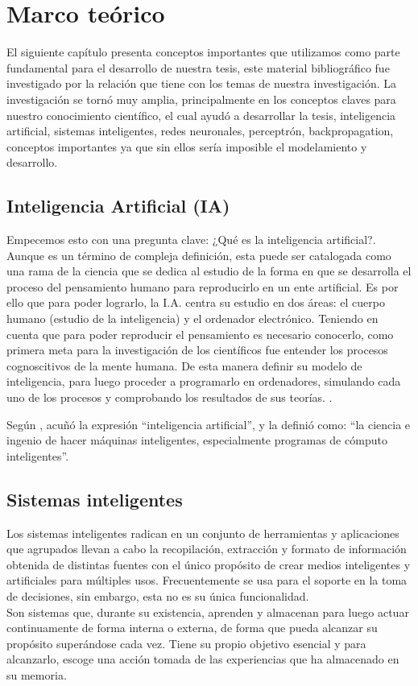 \section{Marco teórico}
El siguiente capítulo presenta conceptos importantes que utilizamos como parte fundamental para el desarrollo de nuestra tesis, este material bibliográfico fue investigado por la relación que tiene con los temas de nuestra investigación. La investigación se tornó muy amplia, principalmente en los conceptos claves para nuestro conocimiento científico, el cual ayudó a desarrollar la tesis, inteligencia artificial, sistemas inteligentes, redes neuronales, perceptrón, backpropagation, conceptos importantes ya que sin ellos sería imposible el modelamiento y desarrollo.

\subsection{Inteligencia Artificial (IA)}
Empecemos esto con una pregunta clave: ¿Qué es la inteligencia artificial?. Aunque es un término de compleja definición, esta puede ser catalogada como una rama de la ciencia que se dedica al estudio de la forma en que se desarrolla el proceso del pensamiento humano para reproducirlo en un ente artificial. Es por ello que para poder lograrlo, la I.A. centra su estudio en dos áreas: el cuerpo humano (estudio de la inteligencia) y el ordenador electrónico. Teniendo en cuenta que para poder reproducir el pensamiento es necesario conocerlo, como primera meta para la investigación de los científicos fue entender los procesos cognoscitivos de la mente humana. De esta manera definir su modelo de inteligencia, para luego proceder a programarlo en ordenadores, simulando cada uno de los procesos y comprobando los resultados de sus teorías. \citep{Belzebu2009}. 

Según \cite{mccarthy1989artificial}, acuñó la expresión ``inteligencia artificial'', y la definió como: ``la ciencia e ingenio de hacer máquinas inteligentes, especialmente programas de cómputo inteligentes''.

\subsection{Sistemas inteligentes}
Los sistemas inteligentes radican en un conjunto de herramientas y aplicaciones que agrupados llevan a cabo la recopilación, extracción y formato de información obtenida de distintas fuentes con el único propósito de crear medios inteligentes y artificiales para múltiples usos. Frecuentemente se usa para el soporte en la toma de decisiones, sin embargo, esta no es su única funcionalidad.\\
Son sistemas que, durante su existencia, aprenden y almacenan para luego actuar continuamente de forma interna o externa, de forma que pueda alcanzar su propósito superándose cada vez. Tiene su propio objetivo esencial y para alcanzarlo, escoge una acción tomada de las experiencias que   ha almacenado en su memoria.

